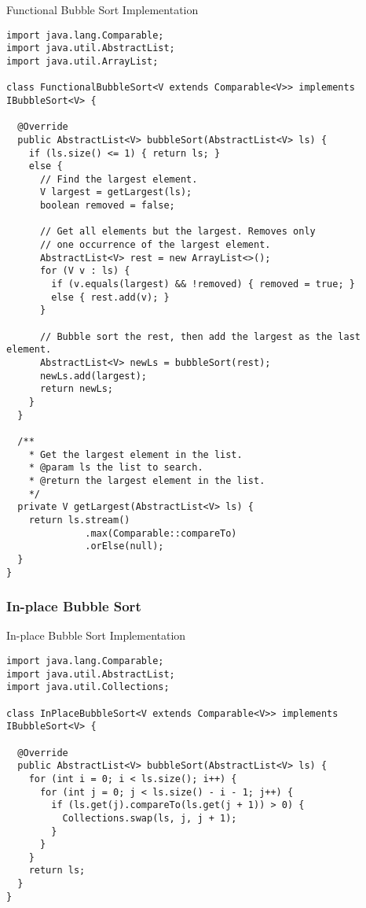 \begin{cl}[]{Functional Bubble Sort Implementation}
\begin{lstlisting}[language=MyJava]
import java.lang.Comparable;
import java.util.AbstractList;
import java.util.ArrayList;

class FunctionalBubbleSort<V extends Comparable<V>> implements IBubbleSort<V> {

  @Override
  public AbstractList<V> bubbleSort(AbstractList<V> ls) {
    if (ls.size() <= 1) { return ls; }
    else {
      // Find the largest element.
      V largest = getLargest(ls);
      boolean removed = false;

      // Get all elements but the largest. Removes only
      // one occurrence of the largest element.
      AbstractList<V> rest = new ArrayList<>();
      for (V v : ls) {
        if (v.equals(largest) && !removed) { removed = true; }
        else { rest.add(v); }
      }

      // Bubble sort the rest, then add the largest as the last element.
      AbstractList<V> newLs = bubbleSort(rest);
      newLs.add(largest);
      return newLs;
    }
  }

  /**
    * Get the largest element in the list.
    * @param ls the list to search.
    * @return the largest element in the list.
    */
  private V getLargest(AbstractList<V> ls) {
    return ls.stream()
              .max(Comparable::compareTo)
              .orElse(null);
  }
}
\end{lstlisting}
\end{cl}

\subsubsection*{In-place Bubble Sort}
\begin{cl}[]{In-place Bubble Sort Implementation}
\begin{lstlisting}[language=MyJava]
import java.lang.Comparable;
import java.util.AbstractList;
import java.util.Collections;

class InPlaceBubbleSort<V extends Comparable<V>> implements IBubbleSort<V> {

  @Override
  public AbstractList<V> bubbleSort(AbstractList<V> ls) {
    for (int i = 0; i < ls.size(); i++) {
      for (int j = 0; j < ls.size() - i - 1; j++) {
        if (ls.get(j).compareTo(ls.get(j + 1)) > 0) {
          Collections.swap(ls, j, j + 1);
        }
      }
    }
    return ls;
  }
}
\end{lstlisting}
\end{cl}

